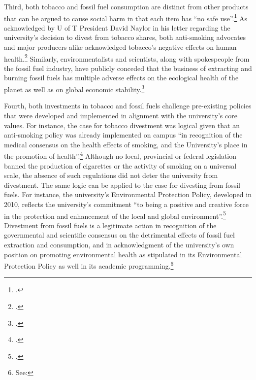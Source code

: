 \documentclass[10pt]{article}
\begin{document}
Third, both tobacco and fossil fuel consumption are distinct from other products that can be argued to cause social harm in that each item has ``no safe use''.\footcite[See: ][p. 9]{TobaccoReport_2007}
As acknowledged by U of T President David Naylor in his letter regarding the university's decision to divest from tobacco shares, both anti-smoking advocates and major producers alike acknowledged tobacco's negative effects on human health.\footcite[][]{TStarSellOff}  
Similarly, environmentalists and scientists, along with spokespeople from the fossil fuel industry, have publicly conceded that the business of extracting and burning fossil fuels has multiple adverse effects on the ecological health of the planet as well as on global economic stability.\footcite[See, for example: ][p. 3--18]{OilIndustryVanDenHove}



Fourth, both investments in tobacco and fossil fuels challenge pre-existing policies that were developed and implemented in alignment with the university's core values. 
For instance, the case for tobacco divestment was logical given that an anti-smoking policy was already implemented on campus ``in recognition of the medical consensus on the health effects of smoking, and the University's place in the promotion of health''.\footcite[See: ][p. 9]{TobaccoReport_2007}
Although no local, provincial or federal legislation banned the production of cigarettes or the activity of smoking on a universal scale, the absence of such regulations did not deter the university from divestment. 
The same logic can be applied to the case for divesting from fossil fuels. 
For instance, the university's Environmental Protection Policy, developed in 2010, reflects the university's commitment ``to being a positive and creative force in the protection and enhancement of the local and global environment''.\footcite[][]{UTEnvProtectionPolicy}
Divestment from fossil fuels is a legitimate action in recognition of the governmental and scientific consensus on the detrimental effects of fossil fuel extraction and consumption, and in acknowledgment of the university's own position on promoting environmental health as stipulated in its Environmental Protection Policy as well in its academic programming.\footnote{See: }
\end{document}
